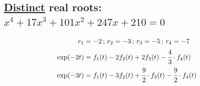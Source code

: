 \documentclass[12pt,a4paper]{article}
\begin{document}
\subsection{\href{https://www.wolframalpha.com/input/?i=e\%5Ex-0.00333766720390944594003509000839337476995*x\%5E3-0.05471789010054762972478553198692239789438*x\%5E2-0.29572198849720742467791802909756049561872*x-0.53460903746011258987097414528706280122716\%3D0}{\color{blue}\underline{Distinct}} real roots: $x^4 + 17 x^3 + 101 x^2 + 247x + 210 = 0$}

\begin{align}
r_1 &= -2\,;\,r_2 = -3\,;\,r_3 = -5\,;\,r_4 = -7 \\
\exp (-2t) &= f_1(t) - 2 f_2(t) + 2 f_3(t) - \cfrac{4}{3}\cdot f_4(t) \\
\exp (-3t) &= f_1(t) - 3 f_2(t) + \cfrac{9}{2} \cdot f_3(t) - \cfrac{9}{2}\cdot f_4(t)
\end{align}
\end{document}
